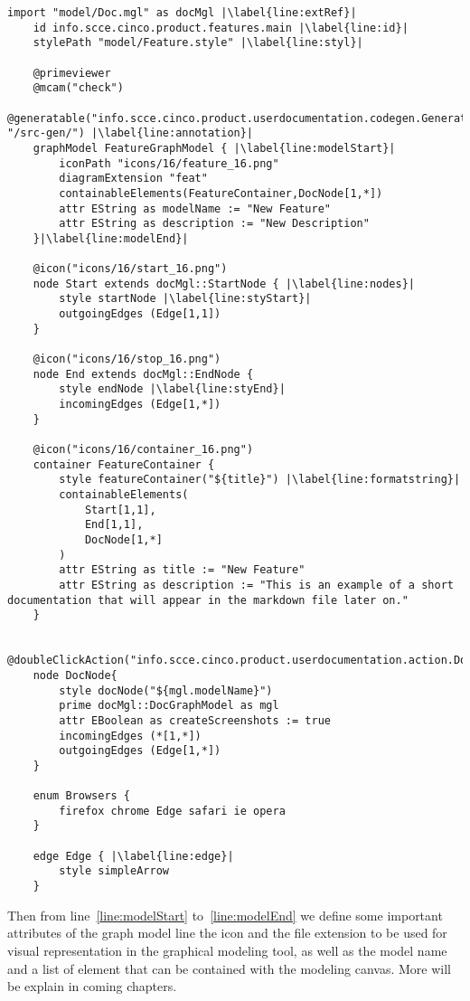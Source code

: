 \begin{lstlisting}[language=MGL, caption={Doc.mgl for the user sequence graph model}, label=docMGL, escapechar=|, name=DocMGL]
    import "model/Doc.mgl" as docMgl |\label{line:extRef}|
    id info.scce.cinco.product.features.main |\label{line:id}|
    stylePath "model/Feature.style" |\label{line:styl}|

    @primeviewer
    @mcam("check")
    @generatable("info.scce.cinco.product.userdocumentation.codegen.Generate", "/src-gen/") |\label{line:annotation}|
    graphModel FeatureGraphModel { |\label{line:modelStart}|
        iconPath "icons/16/feature_16.png"
        diagramExtension "feat"
        containableElements(FeatureContainer,DocNode[1,*])
        attr EString as modelName := "New Feature"
        attr EString as description := "New Description"
    }|\label{line:modelEnd}|

    @icon("icons/16/start_16.png")
    node Start extends docMgl::StartNode { |\label{line:nodes}|
        style startNode |\label{line:styStart}|
        outgoingEdges (Edge[1,1])
    }

    @icon("icons/16/stop_16.png")
    node End extends docMgl::EndNode {
        style endNode |\label{line:styEnd}|
        incomingEdges (Edge[1,*])
    }

    @icon("icons/16/container_16.png")
    container FeatureContainer {
        style featureContainer("${title}") |\label{line:formatstring}|
        containableElements(
            Start[1,1],
            End[1,1],
            DocNode[1,*]
        )
        attr EString as title := "New Feature"
        attr EString as description := "This is an example of a short documentation that will appear in the markdown file later on."
    }
    
    @doubleClickAction("info.scce.cinco.product.userdocumentation.action.DocNodeOpenSubmodel")
    node DocNode{
        style docNode("${mgl.modelName}")
        prime docMgl::DocGraphModel as mgl
        attr EBoolean as createScreenshots := true
        incomingEdges (*[1,*])
        outgoingEdges (Edge[1,*])
    }

    enum Browsers {
        firefox chrome Edge safari ie opera
    }

    edge Edge { |\label{line:edge}|
        style simpleArrow
    }
\end{lstlisting}

Then from line~\ref{line:modelStart} to~\ref{line:modelEnd} we define some important attributes of the graph model line the icon and the file extension to be used for visual representation in the graphical modeling tool, as well as the model name and a list of element that can be contained with the modeling canvas. More will be explain in coming chapters.


